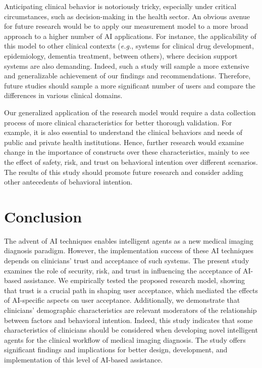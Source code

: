 Anticipating clinical behavior is notoriously tricky, especially under critical circumstances, such as decision-making in the health sector.
An obvious avenue for future research would be to apply our measurement model to a more broad approach to a higher number of AI applications.
For instance, the applicability of this model to other clinical contexts ({\it e.g.}, systems for clinical drug development, epidemiology, dementia treatment, between others), where decision support systems are also demanding.
Indeed, such a study will sample a more extensive and generalizable achievement of our findings and recommendations.
Therefore, future studies should sample a more significant number of users and compare the differences in various clinical domains.

Our generalized application of the research model would require a data collection process of more clinical characteristics for better thorough validation.
For example, it is also essential to understand the clinical behaviors and needs of public and private health institutions.
Hence, further research would examine change in the importance of constructs over these characteristics, mainly to see the effect of safety, risk, and trust on behavioral intention over different scenarios.
The results of this study should promote future research and consider adding other antecedents of behavioral intention.

\section{Conclusion}
\label{sec:chap004010}

The advent of AI techniques enables intelligent agents as a new medical imaging diagnosis paradigm.
However, the implementation success of these AI techniques depends on clinicians' trust and acceptance of such systems.
The present study examines the role of security, risk, and trust in influencing the acceptance of AI-based assistance.
We empirically tested the proposed research model, showing that trust is a crucial path in shaping user acceptance, which mediated the effects of AI-specific aspects on user acceptance.
Additionally, we demonstrate that clinicians' demographic characteristics are relevant moderators of the relationship between factors and behavioral intention.
Indeed, this study indicates that some characteristics of clinicians should be considered when developing novel intelligent agents for the clinical workflow of medical imaging diagnosis.
The study offers significant findings and implications for better design, development, and implementation of this level of AI-based assistance.

